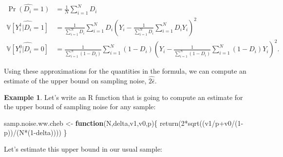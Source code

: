 \documentclass[
]{book}
\newenvironment{Shaded}{\begin{snugshade}}{\end{snugshade}}
\newcommand{\ControlFlowTok}[1]{\textcolor[rgb]{0.13,0.29,0.53}{\textbf{#1}}}
\newcommand{\DecValTok}[1]{\textcolor[rgb]{0.00,0.00,0.81}{#1}}
\newcommand{\FunctionTok}[1]{\textcolor[rgb]{0.00,0.00,0.00}{#1}}
\newcommand{\NormalTok}[1]{#1}
\newcommand{\OtherTok}[1]{\textcolor[rgb]{0.56,0.35,0.01}{#1}}
\newcommand{\SpecialCharTok}[1]{\textcolor[rgb]{0.00,0.00,0.00}{#1}}
\newcommand{\var}[1]{\mathbb{V}[ #1 ]}
\theoremstyle{definition}
\theoremstyle{definition}
\newtheorem{example}{Example}[chapter]
\theoremstyle{definition}
\theoremstyle{definition}
\theoremstyle{remark}
\begin{document}
\begin{align*}
  \hat{\Pr(D_i=1)} & = \frac{1}{N}\sum_{i=1}^ND_i\\
  \hat{\var{Y_i^1|D_i=1}} & = \frac{1}{\sum_{i=1}^ND_i}\sum_{i=1}^ND_i(Y_i-\frac{1}{\sum_{i=1}^ND_i}\sum_{i=1}^ND_iY_i)^2\\
  \hat{\var{Y_i^0|D_i=0}} & = \frac{1}{\sum_{i=1}^N(1-D_i)}\sum_{i=1}^N(1-D_i)(Y_i-\frac{1}{\sum_{i=1}^N(1-D_i)}\sum_{i=1}^N(1-D_i)Y_i)^2.
\end{align*}

Using these approximations for the quantities in the formula, we can compute an estimate of the upper bound on sampling noise, \(\hat{2\bar{\epsilon}}\).

\begin{example}
\protect\hypertarget{exm:unnamed-chunk-47}{}{\label{exm:unnamed-chunk-47} }Let's write an R function that is going to compute an estimate for the upper bound of sampling noise for any sample:
\end{example}

\begin{Shaded}
\begin{Highlighting}[]
\NormalTok{samp.noise.ww.cheb }\OtherTok{\textless{}{-}} \ControlFlowTok{function}\NormalTok{(N,delta,v1,v0,p)\{}
  \FunctionTok{return}\NormalTok{(}\DecValTok{2}\SpecialCharTok{*}\FunctionTok{sqrt}\NormalTok{((v1}\SpecialCharTok{/}\NormalTok{p}\SpecialCharTok{+}\NormalTok{v0}\SpecialCharTok{/}\NormalTok{(}\DecValTok{1}\SpecialCharTok{{-}}\NormalTok{p))}\SpecialCharTok{/}\NormalTok{(N}\SpecialCharTok{*}\NormalTok{(}\DecValTok{1}\SpecialCharTok{{-}}\NormalTok{delta))))}
\NormalTok{\}}
\end{Highlighting}
\end{Shaded}

Let's estimate this upper bound in our usual sample:
\end{document}
